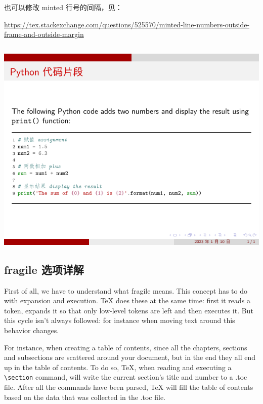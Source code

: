 也可以修改 minted 行号的间隔，见：

\url{https://tex.stackexchange.com/questions/525570/minted-line-numbers-outside-frame-and-outside-margin}

\inputminted[linenos=true]{latex}{examples/beamer/beamercodelisting03.tex}

\includegraphics{examples/beamer/beamercodelisting03.pdf}

\subsection{{\ttfamily fragile} 选项详解}

First of all, we have to understand what {\ttfamily fragile} means. This concept has to do with expansion and execution. {\TeX} does these at the same time: first it reads a token, expands it so that only low-level tokens are left and then executes it. But this cycle isn’t always followed: for instance when moving text around this behavior changes.

For instance, when creating a table of contents, since all the chapters, sections and subsections are scattered around your document, but in the end they all end up in the table of contents. To do so, {\TeX}, when reading and executing a \verb|\section| command, will write the current section’s title and number to a .toc file. After all the commands have been parsed, {\TeX} will fill the table of contents based on the data that was collected in the .toc file.

